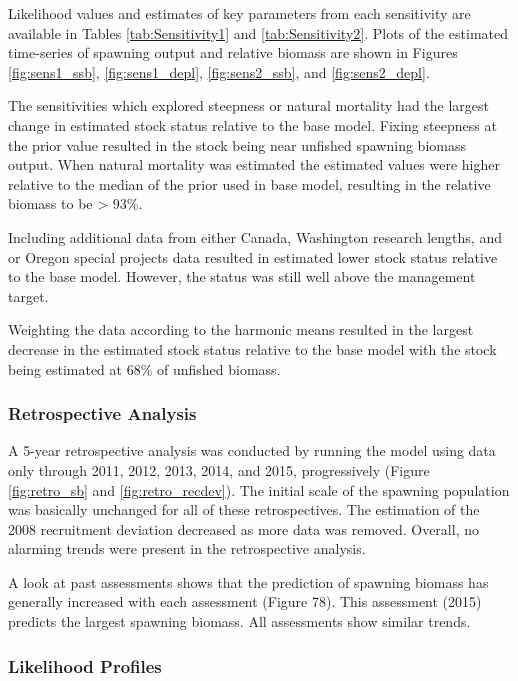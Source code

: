 \documentclass[12pt,]{article}
\begin{document}
Likelihood values and estimates of key parameters from each sensitivity
are available in Tables \ref{tab:Sensitivity1} and
\ref{tab:Sensitivity2}. Plots of the estimated time-series of spawning
output and relative biomass are shown in Figures \ref{fig:sens1_ssb},
\ref{fig:sens1_depl}, \ref{fig:sens2_ssb}, and \ref{fig:sens2_depl}.

The sensitivities which explored steepness or natural mortality had the
largest change in estimated stock status relative to the base model.
Fixing steepness at the prior value resulted in the stock being near
unfished spawning biomass output. When natural mortality was estimated
the estimated values were higher relative to the median of the prior
used in base model, resulting in the relative biomass to be
\textgreater{} 93\%.

Including additional data from either Canada, Washington research
lengths, and or Oregon special projects data resulted in estimated lower
stock status relative to the base model. However, the status was still
well above the management target.

Weighting the data according to the harmonic means resulted in the
largest decrease in the estimated stock status relative to the base
model with the stock being estimated at 68\% of unfished biomass.

\subsubsection{Retrospective Analysis}\label{retrospective-analysis}

A 5-year retrospective analysis was conducted by running the model using
data only through 2011, 2012, 2013, 2014, and 2015, progressively
(Figure \ref{fig:retro_sb} and \ref{fig:retro_recdev}). The initial
scale of the spawning population was basically unchanged for all of
these retrospectives. The estimation of the 2008 recruitment deviation
decreased as more data was removed. Overall, no alarming trends were
present in the retrospective analysis.

A look at past assessments shows that the prediction of spawning biomass
has generally increased with each assessment (Figure 78). This
assessment (2015) predicts the largest spawning biomass. All assessments
show similar trends.

\subsubsection{Likelihood Profiles}\label{likelihood-profiles}
\end{document}
